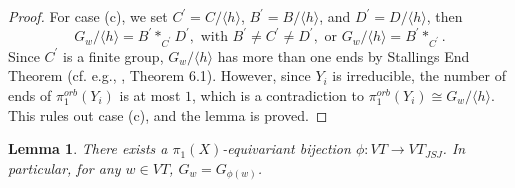 \documentclass[11pt]{amsart}
\theoremstyle{plain}
\numberwithin{theorem}{section}
\newtheorem{lemma}[theorem]{Lemma}
\theoremstyle{definition}
\begin{document}
\begin{proof}
For case (c), we set $C^\prime=C/\langle h\rangle$, $B^\prime=B/\langle h\rangle$,
and $D^\prime=D/\langle h\rangle$, then 
$$
G_w/\langle h\rangle = B^\prime\ast_{C^\prime} D^\prime, \mbox{ with } B^\prime\neq C^\prime\neq D^\prime,
\mbox { or } G_w/\langle h\rangle =B^\prime\ast_{C^\prime}.
$$
Since $C^\prime$ is a finite group, $G_w/\langle h\rangle$ has more than one ends by Stallings End Theorem (cf. e.g., \cite{SW}, Theorem 6.1).  However, since $Y_i$ is irreducible, the number of ends of 
$\pi_1^{orb}(Y_i)$ is at most $1$, which is a contradiction to $\pi_1^{orb}(Y_i)\cong G_w/\langle h\rangle$.
This rules out case (c), and the lemma is proved. 

\end{proof}

\begin{lemma}
There exists a $\pi_1(X)$-equivariant bijection $\phi: VT\rightarrow VT_{JSJ}$. In particular, 
for any $w\in VT$, $G_w=G_{\phi(w)}$. 
\end{lemma}
\end{document}
